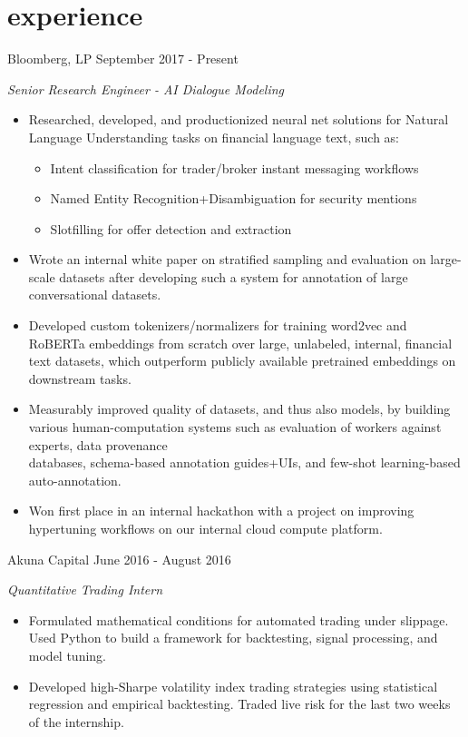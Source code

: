 \documentclass[print]{friggeri-cv} %
\begin{document}
\section{experience}

\begin{entrylist}

\entry
{Bloomberg, LP}
{September 2017 - Present}
{\emph{Senior Research Engineer - AI Dialogue Modeling}
\begin{itemize}
\item Researched, developed, and productionized neural net solutions for Natural Language Understanding tasks on financial language text, such as:
\begin{itemize}
\item Intent classification for trader/broker instant messaging workflows
\item Named Entity Recognition+Disambiguation for security mentions
\item Slotfilling for offer detection and extraction
\end{itemize}
\item Wrote an internal white paper on stratified sampling and evaluation on large-scale datasets after developing such a system for annotation of large conversational datasets.
\item Developed custom tokenizers/normalizers for training word2vec and RoBERTa embeddings from scratch over large, unlabeled, internal, financial text datasets, which outperform publicly available pretrained embeddings on downstream tasks.
\item Measurably improved quality of datasets, and thus also models, by building various human-computation systems such as evaluation of workers against experts, data provenance \\databases, schema-based annotation guides+UIs, and few-shot learning-based auto-annotation.
\item Won first place in an internal hackathon with a project on improving hypertuning workflows on our internal cloud compute platform.
\end{itemize}}
\entry
{Akuna Capital}
{June 2016 - August 2016}
{\emph{Quantitative Trading Intern}
\begin{itemize}
\item Formulated mathematical conditions for automated trading under slippage. Used Python to build a framework for backtesting, signal processing, and model tuning. 
\item Developed high-Sharpe volatility index trading strategies using statistical regression and empirical backtesting. Traded live risk for the last two weeks of the internship. 

\end{itemize}}
\end{entrylist}
\end{document}
